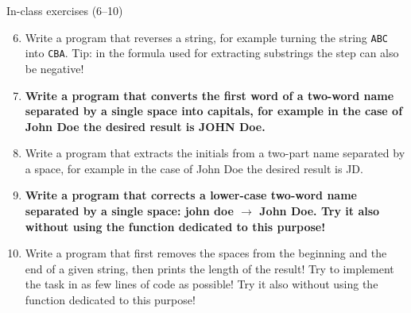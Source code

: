 \documentclass[aspectratio=169,11pt]{beamer}
\begin{document}
\begin{frame}{In-class exercises (6--10)}
  \small
  \begin{enumerate}
    \setcounter{enumi}{5}
    \item Write a program that reverses a string, for example turning the
      string \texttt{ABC} into \texttt{CBA}. Tip: in the formula used for
      extracting substrings the step can also be negative!
    \item \textbf{Write a program that converts the first word of a two-word name
          separated by a single space into capitals, for example in the case of
      John Doe the desired result is JOHN Doe.}
    \item Write a program that extracts the initials from a two-part name
          separated by a space, for example in the case of John Doe the desired
      result is JD.
    \item \textbf{Write a program that corrects a lower-case two-word name separated by
          a single space: john doe $\rightarrow$ John Doe. Try it also without
      using the function dedicated to this purpose!}
    \item Write a program that first removes the spaces from the beginning
          and the end of a given string, then prints the length of the result!
          Try to implement the task in as few lines of code as possible! Try it
      also without using the function dedicated to this purpose!
  \end{enumerate}
\end{frame}
\end{document}
